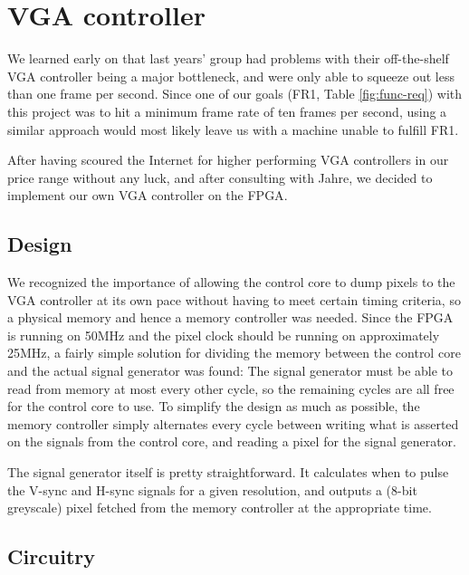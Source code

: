 \section{VGA controller}

We learned early on that last years' group had problems with their off-the-shelf
\ac{VGA} controller being a major bottleneck, and were only able to squeeze out
less than one frame per second. Since one of our goals (FR1, Table
\ref{fig:func-req}) with this project was to hit a minimum frame rate of ten
frames per second, using a similar approach would most likely leave us with a
machine unable to fulfill FR1.

After having scoured the Internet for higher performing \ac{VGA} controllers in our
price range without any luck, and after consulting with Jahre, we decided to
implement our own \ac{VGA} controller on the \ac{FPGA}.



\subsection{Design}
We recognized the importance of allowing the control core to dump pixels to the
\ac{VGA} controller at its own pace without having to meet certain timing criteria,
so a physical memory and hence a memory controller was needed. Since the \ac{FPGA}
is running on 50MHz  and the pixel clock should be running on approximately
25MHz, a fairly simple solution for dividing the memory between the control
core and the actual signal generator was found: The signal generator must be
able to read from memory at most every other cycle, so the remaining cycles are
all free for the control core to use. To simplify the design as much as
possible, the memory controller simply alternates every cycle between writing
what is asserted on the signals from the control core, and reading a pixel
for the signal generator.

The signal generator itself is pretty straightforward. It calculates
when to pulse the V-sync and H-sync signals for a given resolution, and outputs
a (8-bit greyscale) pixel fetched from the memory controller at the appropriate
time.

\subsection{Circuitry}
 

